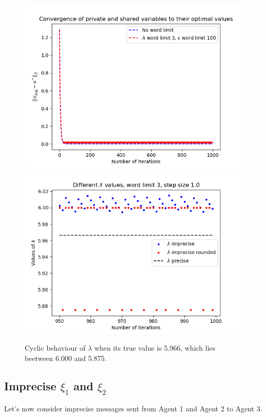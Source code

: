 \documentclass[12pt]{article}
\begin{document}
\begin{figure}[H]
	\includegraphics[scale=0.5]{Problem4-lambda3.png}
	\includegraphics[scale=0.5]{Problem4-lambda4.png}
	\caption{Cyclic behaviour of $\lambda$ when its true value is 5.966, which lies beetween 6.000 and 5.875.}
\end{figure}

\subsection*{Imprecise $\xi_1$ and $\xi_2$}

Let's now consider imprecise messages sent from Agent 1 and Agent 2 to Agent 3.
\end{document}
